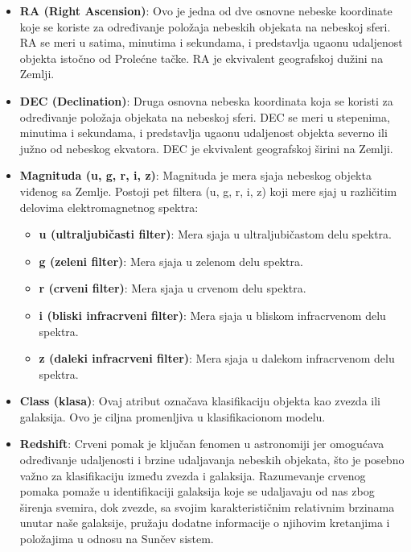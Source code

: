 \documentclass[a4paper,12pt]{article}
\begin{document}
\begin{itemize}
    \item \textbf{RA (Right Ascension)}: Ovo je jedna od dve osnovne nebeske koordinate koje se koriste za određivanje položaja nebeskih objekata na nebeskoj sferi. RA se meri u satima, minutima i sekundama, i predstavlja ugaonu udaljenost objekta istočno od Prolećne tačke. RA je ekvivalent geografskoj dužini na Zemlji.
    
    \item \textbf{DEC (Declination)}: Druga osnovna nebeska koordinata koja se koristi za određivanje položaja objekata na nebeskoj sferi. DEC se meri u stepenima, minutima i sekundama, i predstavlja ugaonu udaljenost objekta severno ili južno od nebeskog ekvatora. DEC je ekvivalent geografskoj širini na Zemlji.
    
    \item \textbf{Magnituda (u, g, r, i, z)}: Magnituda je mera sjaja nebeskog objekta viđenog sa Zemlje. Postoji pet filtera (u, g, r, i, z) koji mere sjaj u različitim delovima elektromagnetnog spektra:
    \begin{itemize}
        \item \textbf{u (ultraljubičasti filter)}: Mera sjaja u ultraljubičastom delu spektra.
        \item \textbf{g (zeleni filter)}: Mera sjaja u zelenom delu spektra.
        \item \textbf{r (crveni filter)}: Mera sjaja u crvenom delu spektra.
        \item \textbf{i (bliski infracrveni filter)}: Mera sjaja u bliskom infracrvenom delu spektra.
        \item \textbf{z (daleki infracrveni filter)}: Mera sjaja u dalekom infracrvenom delu spektra.
    \end{itemize}
    
    \item \textbf{Class (klasa)}: Ovaj atribut označava klasifikaciju objekta kao zvezda ili galaksija. Ovo je ciljna promenljiva u klasifikacionom modelu.
    
    \item \textbf{Redshift}: Crveni pomak je ključan fenomen u astronomiji jer omogućava određivanje udaljenosti i brzine udaljavanja nebeskih objekata, što je posebno važno za klasifikaciju između zvezda i galaksija. Razumevanje crvenog pomaka pomaže u identifikaciji galaksija koje se udaljavaju od nas zbog širenja svemira, dok zvezde, sa svojim karakterističnim relativnim brzinama unutar naše galaksije, pružaju dodatne informacije o njihovim kretanjima i položajima u odnosu na Sunčev sistem.
\end{itemize}
\end{document}
